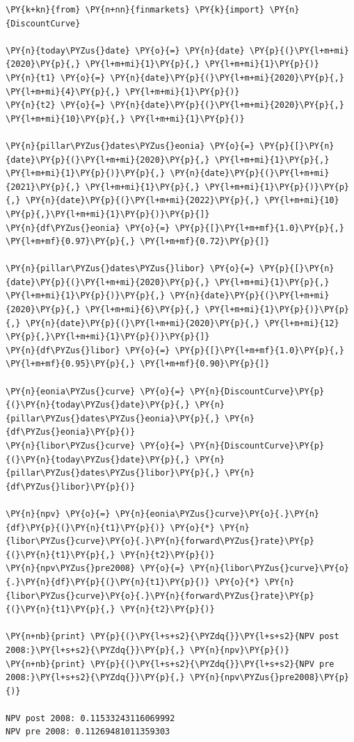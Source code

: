 \begin{codebox}
\begin{Verbatim}[commandchars=\\\{\}]
\PY{k+kn}{from} \PY{n+nn}{finmarkets} \PY{k}{import} \PY{n}{DiscountCurve}
	
\PY{n}{today\PYZus{}date} \PY{o}{=} \PY{n}{date} \PY{p}{(}\PY{l+m+mi}{2020}\PY{p}{,} \PY{l+m+mi}{1}\PY{p}{,} \PY{l+m+mi}{1}\PY{p}{)}
\PY{n}{t1} \PY{o}{=} \PY{n}{date}\PY{p}{(}\PY{l+m+mi}{2020}\PY{p}{,} \PY{l+m+mi}{4}\PY{p}{,} \PY{l+m+mi}{1}\PY{p}{)}
\PY{n}{t2} \PY{o}{=} \PY{n}{date}\PY{p}{(}\PY{l+m+mi}{2020}\PY{p}{,} \PY{l+m+mi}{10}\PY{p}{,} \PY{l+m+mi}{1}\PY{p}{)}

\PY{n}{pillar\PYZus{}dates\PYZus{}eonia} \PY{o}{=} \PY{p}{[}\PY{n}{date}\PY{p}{(}\PY{l+m+mi}{2020}\PY{p}{,} \PY{l+m+mi}{1}\PY{p}{,} \PY{l+m+mi}{1}\PY{p}{)}\PY{p}{,} \PY{n}{date}\PY{p}{(}\PY{l+m+mi}{2021}\PY{p}{,} \PY{l+m+mi}{1}\PY{p}{,} \PY{l+m+mi}{1}\PY{p}{)}\PY{p}{,} \PY{n}{date}\PY{p}{(}\PY{l+m+mi}{2022}\PY{p}{,} \PY{l+m+mi}{10} \PY{p}{,}\PY{l+m+mi}{1}\PY{p}{)}\PY{p}{]}
\PY{n}{df\PYZus{}eonia} \PY{o}{=} \PY{p}{[}\PY{l+m+mf}{1.0}\PY{p}{,} \PY{l+m+mf}{0.97}\PY{p}{,} \PY{l+m+mf}{0.72}\PY{p}{]}
	
\PY{n}{pillar\PYZus{}dates\PYZus{}libor} \PY{o}{=} \PY{p}{[}\PY{n}{date}\PY{p}{(}\PY{l+m+mi}{2020}\PY{p}{,} \PY{l+m+mi}{1}\PY{p}{,} \PY{l+m+mi}{1}\PY{p}{)}\PY{p}{,} \PY{n}{date}\PY{p}{(}\PY{l+m+mi}{2020}\PY{p}{,} \PY{l+m+mi}{6}\PY{p}{,} \PY{l+m+mi}{1}\PY{p}{)}\PY{p}{,} \PY{n}{date}\PY{p}{(}\PY{l+m+mi}{2020}\PY{p}{,} \PY{l+m+mi}{12} \PY{p}{,}\PY{l+m+mi}{1}\PY{p}{)}\PY{p}{]}
\PY{n}{df\PYZus{}libor} \PY{o}{=} \PY{p}{[}\PY{l+m+mf}{1.0}\PY{p}{,} \PY{l+m+mf}{0.95}\PY{p}{,} \PY{l+m+mf}{0.90}\PY{p}{]}
		
\PY{n}{eonia\PYZus{}curve} \PY{o}{=} \PY{n}{DiscountCurve}\PY{p}{(}\PY{n}{today\PYZus{}date}\PY{p}{,} \PY{n}{pillar\PYZus{}dates\PYZus{}eonia}\PY{p}{,} \PY{n}{df\PYZus{}eonia}\PY{p}{)}
\PY{n}{libor\PYZus{}curve} \PY{o}{=} \PY{n}{DiscountCurve}\PY{p}{(}\PY{n}{today\PYZus{}date}\PY{p}{,} \PY{n}{pillar\PYZus{}dates\PYZus{}libor}\PY{p}{,} \PY{n}{df\PYZus{}libor}\PY{p}{)}
	
\PY{n}{npv} \PY{o}{=} \PY{n}{eonia\PYZus{}curve}\PY{o}{.}\PY{n}{df}\PY{p}{(}\PY{n}{t1}\PY{p}{)} \PY{o}{*} \PY{n}{libor\PYZus{}curve}\PY{o}{.}\PY{n}{forward\PYZus{}rate}\PY{p}{(}\PY{n}{t1}\PY{p}{,} \PY{n}{t2}\PY{p}{)}
\PY{n}{npv\PYZus{}pre2008} \PY{o}{=} \PY{n}{libor\PYZus{}curve}\PY{o}{.}\PY{n}{df}\PY{p}{(}\PY{n}{t1}\PY{p}{)} \PY{o}{*} \PY{n}{libor\PYZus{}curve}\PY{o}{.}\PY{n}{forward\PYZus{}rate}\PY{p}{(}\PY{n}{t1}\PY{p}{,} \PY{n}{t2}\PY{p}{)}
	
\PY{n+nb}{print} \PY{p}{(}\PY{l+s+s2}{\PYZdq{}}\PY{l+s+s2}{NPV post 2008:}\PY{l+s+s2}{\PYZdq{}}\PY{p}{,} \PY{n}{npv}\PY{p}{)}
\PY{n+nb}{print} \PY{p}{(}\PY{l+s+s2}{\PYZdq{}}\PY{l+s+s2}{NPV pre 2008:}\PY{l+s+s2}{\PYZdq{}}\PY{p}{,} \PY{n}{npv\PYZus{}pre2008}\PY{p}{)}
	
NPV post 2008: 0.11533243116069992
NPV pre 2008: 0.11269481011359303
\end{Verbatim}
\end{codebox}

